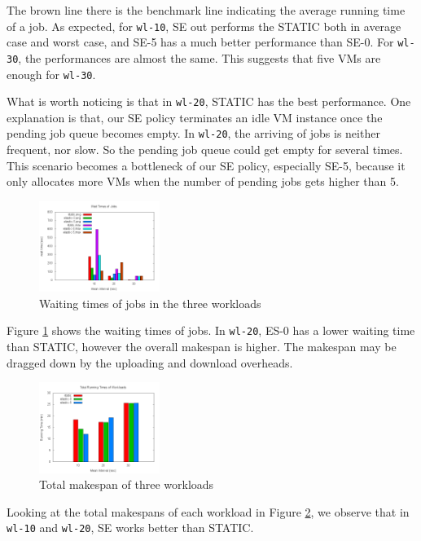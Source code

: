 The brown line there is the benchmark line indicating the average running time of a job. As expected, for \texttt{wl-10}, SE out performs the STATIC both in average case and worst case, and SE-5 has a much better performance than SE-0. For \texttt{wl-30}, the performances are almost the same. This suggests that five VMs are enough for \texttt{wl-30}.

What is worth noticing is that in \texttt{wl-20}, STATIC has the best performance. One explanation is that, our SE policy terminates an idle VM instance once the pending job queue becomes empty. In \texttt{wl-20}, the arriving of jobs is neither frequent, nor slow. So the pending job queue could get empty for several times. This scenario becomes a bottleneck of our SE policy, especially SE-5, because it only allocates more VMs when the number of pending jobs gets higher than 5.

\begin{figure}[!t]
\centering
\includegraphics[width=0.35\textwidth]{pictures/all-waittimes.png}
\caption{Waiting times of jobs in the three workloads}
\label{figure_jobwaittime}
\end{figure}

Figure \ref{figure_jobwaittime} shows the waiting times of jobs. In \texttt{wl-20}, ES-0 has a lower waiting time than STATIC, however the overall makespan is higher. The makespan may be dragged down by the uploading and download overheads.

\begin{figure}[!t]
\centering
\includegraphics[width=0.35\textwidth]{pictures/workload-runtime.png}
\caption{Total makespan of three workloads}
\label{figure_workloadmakespan}
\end{figure}

Looking at the total makespans of each workload in Figure \ref{figure_workloadmakespan}, we observe that in \texttt{wl-10} and \texttt{wl-20}, SE works better than STATIC.


